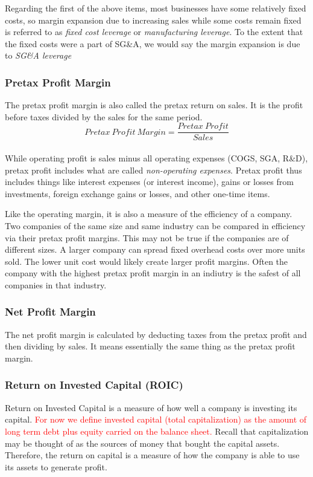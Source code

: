 \documentclass{article}
\begin{document}
Regarding the first of the above items, most businesses have some relatively fixed costs, so margin expansion due to increasing sales while some costs remain fixed is referred to as \textit{fixed cost leverage} or \textit{manufacturing leverage}. To the extent that the fixed costs were a part of SG\&A, we would say the margin expansion is due to \textit{SG\&A leverage}

\subsubsection{Pretax Profit Margin}
The pretax profit margin is also called the pretax return on sales. It is the profit before taxes divided by the sales for the same period. 
\begin{equation}
    Pretax\: Profit\: Margin = \frac{Pretax\: Profit}{Sales}
\end{equation}\\

While operating profit is sales minus all operating expenses (COGS, SGA, R\&D), pretax profit includes what are called \textit{non-operating expenses}. Pretax profit thus includes things like interest expenses (or interest income), gains or losses from investments, foreign exchange gains or losses, and other one-time items. 

Like the operating margin, it is also a measure of the efficiency of a company. Two companies of the same size and same industry can be compared in efficiency via their pretax profit margins. This may not be true if the companies are of different sizes. A larger company can spread fixed overhead costs over more units sold. The lower unit cost would likely create larger profit margins. Often the company with the highest pretax profit margin in an indiutry is the safest of all companies in that industry. 

\subsubsection{Net Profit Margin}
The net profit margin is calculated by deducting taxes from the pretax profit and then dividing by sales. It means essentially the same thing as the pretax profit margin. 

\subsubsection{Return on Invested Capital (ROIC)}
Return on Invested Capital is a measure of how well a company is investing its capital. \textcolor{red}{For now we define invested capital (total capitalization) as the amount of long term debt plus equity carried on the balance sheet.} Recall that capitalization may be thought of as the sources of money that bought the capital assets. Therefore, the return on capital is a measure of how the company is able to use its assets to generate profit. 
\end{document}
